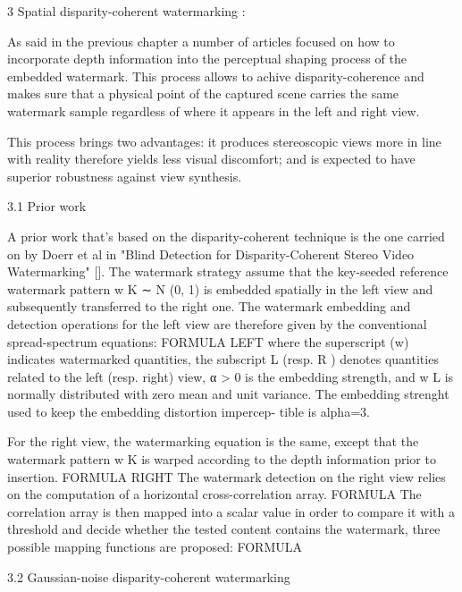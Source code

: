 
3 Spatial disparity-coherent watermarking :

As said in the previous chapter a number of articles focused on how to incorporate depth information into the perceptual shaping process of the embedded watermark. This process allows to achive disparity-coherence and makes sure that a physical point of the captured scene carries the same watermark sample regardless of where it appears in the left and right view.

This process brings two advantages: it produces stereoscopic views more in line with reality therefore yields less visual discomfort; and is expected to have superior robustness against view synthesis.

3.1 Prior work

A prior work that's based on the disparity-coherent technique is the one carried on by Doerr et al in "Blind Detection for Disparity-Coherent
Stereo Video Watermarking" []. 
The watermark strategy  assume that the key-seeded reference watermark pattern w K ∼ N (0, 1) is embedded spatially in the left view and subsequently transferred to the right one.
The watermark embedding and detection operations for the left view are therefore given by the conventional spread-spectrum equations:
FORMULA LEFT 
where the superscript (w) indicates watermarked quantities, the subscript L (resp. R ) denotes quantities related
to the left (resp. right) view, α > 0 is the embedding strength, and w L is normally distributed with zero mean and unit variance.
The embedding strenght used to keep the embedding distortion impercep-
tible is alpha=3. 

For the right view, the watermarking equation is the same, except that the watermark pattern w K is warped according to the depth information prior to insertion.
FORMULA RIGHT
The watermark detection on the right view relies on the computation of a horizontal cross-correlation array. 
FORMULA
The correlation array is then mapped into a scalar value in order to compare it with a threshold and decide whether the tested content contains the watermark, three possible mapping functions are proposed:
FORMULA


3.2 Gaussian-noise disparity-coherent watermarking

